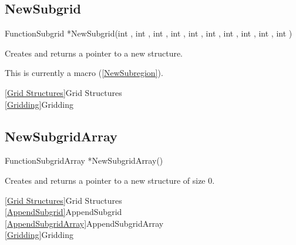 
\newpage
\subsection{NewSubgrid}
\label{NewSubgrid}


\begin{deftypefn}{Function}{Subgrid *}{NewSubgrid}(int , int , int , int , int , int , int , int , int , int )

\DESCRIPTION
Creates and returns a pointer to a new  structure.

\NOTES
This is currently a macro (\ref{NewSubregion}).

\SEEALSO
\vref{Grid Structures}{Grid Structures}\\
\vref{Gridding}{Gridding}

\end{deftypefn}


\newpage
\subsection{NewSubgridArray}
\label{NewSubgridArray}


\begin{deftypefn}{Function}{SubgridArray *}{NewSubgridArray}()

\DESCRIPTION
Creates and returns a pointer to a new  structure
of size 0.

\SEEALSO
\vref{Grid Structures}{Grid Structures}\\
\vref{AppendSubgrid}{AppendSubgrid}\\
\vref{AppendSubgridArray}{AppendSubgridArray}\\
\vref{Gridding}{Gridding}

\end{deftypefn}


